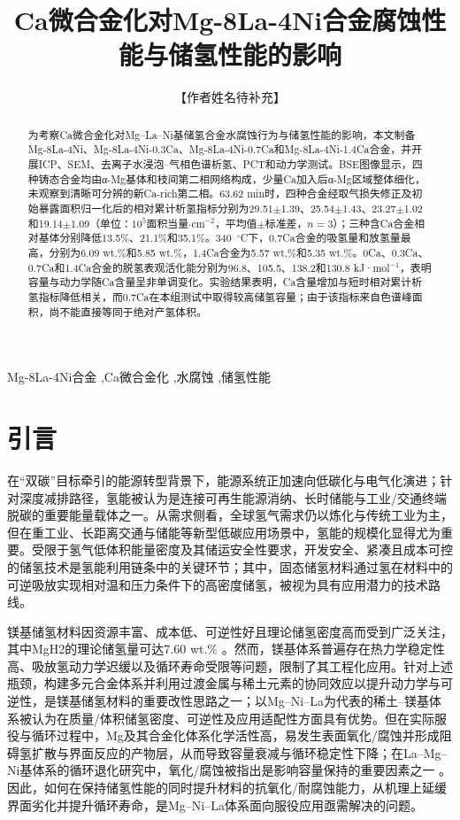 \documentclass[preprint,12pt]{elsarticle}
\begin{document}
\begin{frontmatter}
\title{Ca微合金化对Mg-8La-4Ni合金腐蚀性能与储氢性能的影响}
\author[aff1]{【作者姓名待补充】}
\begin{abstract}
为考察Ca微合金化对Mg--La--Ni基储氢合金水腐蚀行为与储氢性能的影响，本文制备Mg-8La-4Ni、Mg-8La-4Ni-0.3Ca、Mg-8La-4Ni-0.7Ca和Mg-8La-4Ni-1.4Ca合金，并开展ICP、SEM、去离子水浸泡--气相色谱析氢、PCT和动力学测试。BSE图像显示，四种铸态合金均由α-Mg基体和枝间第二相网络构成，少量Ca加入后α-Mg区域整体细化，未观察到清晰可分辨的新Ca-rich第二相。63.62 min时，四种合金经取气损失修正及初始暴露面积归一化后的相对累计析氢指标分别为29.51$\pm$1.39、25.54$\pm$1.43、23.27$\pm$1.02和19.14$\pm$1.09（单位：$10^{5}$面积当量$\cdot\mathrm{cm}^{-2}$，平均值$\pm$标准差，$n=3$）；三种含Ca合金相对基体分别降低13.5\%、21.1\%和35.1\%。340~$^{\circ}$C下，0.7Ca合金的吸氢量和放氢量最高，分别为6.09 wt.\%和5.85 wt.\%，1.4Ca合金为5.57 wt.\%和5.35 wt.\%。0Ca、0.3Ca、0.7Ca和1.4Ca合金的脱氢表观活化能分别为96.8、105.5、138.2和130.8 kJ·mol$^{-1}$，表明容量与动力学随Ca含量呈非单调变化。实验结果表明，Ca含量增加与短时相对累计析氢指标降低相关，而0.7Ca在本组测试中取得较高储氢容量；由于该指标来自色谱峰面积，尚不能直接等同于绝对产氢体积。
\end{abstract}
\begin{keyword}Mg-8La-4Ni合金 \sep Ca微合金化 \sep 水腐蚀 \sep 储氢性能\end{keyword}
\end{frontmatter}
\fontsize{10.5}{18}\selectfont
\section{引言}

在“双碳”目标牵引的能源转型背景下，能源系统正加速向低碳化与电气化演进；针对深度减排路径，氢能被认为是连接可再生能源消纳、长时储能与工业/交通终端脱碳的重要能量载体之一\cite{ref1}。从需求侧看，全球氢气需求仍以炼化与传统工业为主，但在重工业、长距离交通与储能等新型低碳应用场景中，氢能的规模化显得尤为重要\cite{ref2}。受限于氢气低体积能量密度及其储运安全性要求，开发安全、紧凑且成本可控的储氢技术是氢能利用链条中的关键环节；其中，固态储氢材料通过氢在材料中的可逆吸放实现相对温和压力条件下的高密度储氢，被视为具有应用潜力的技术路线\cite{ref3}。

镁基储氢材料因资源丰富、成本低、可逆性好且理论储氢密度高而受到广泛关注，其中MgH2的理论储氢量可达7.60 wt.\% \cite{ref3}。然而，镁基体系普遍存在热力学稳定性高、吸放氢动力学迟缓以及循环寿命受限等问题，限制了其工程化应用。针对上述瓶颈，构建多元合金体系并利用过渡金属与稀土元素的协同效应以提升动力学与可逆性，是镁基储氢材料的重要改性思路之一；以Mg–Ni–La为代表的稀土–镁基体系被认为在质量/体积储氢密度、可逆性及应用适配性方面具有优势\cite{ref4}。但在实际服役与循环过程中，Mg及其合金化体系化学活性高，易发生表面氧化/腐蚀并形成阻碍氢扩散与界面反应的产物层，从而导致容量衰减与循环稳定性下降；在La–Mg–Ni基体系的循环退化研究中，氧化/腐蚀被指出是影响容量保持的重要因素之一\cite{ref5} 。因此，如何在保持储氢性能的同时提升材料的抗氧化/耐腐蚀能力，从机理上延缓界面劣化并提升循环寿命，是Mg–Ni–La体系面向服役应用亟需解决的问题。
\end{document}
